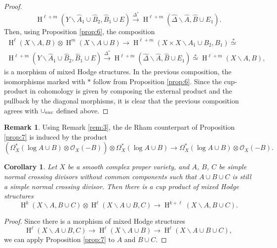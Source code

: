 \documentclass[11pt,a4paper]{amsart}
\newcommand{\caO}{\mathcal{O}}
\DeclareMathOperator{\rH}{H}
\newcommand{\exc}{\text{\rm exc}}
\numberwithin{equation}{section}
\theoremstyle{plain}
\newtheorem{cor}[prop]{Corollary}
\theoremstyle{definition}
\newtheorem{rmk}[prop]{Remark}
\begin{document}
\begin{proof}
\begin{displaymath}
   \rH^{\ell+m}(Y\smallsetminus \widehat A_{1}\cup \widehat
  B_{2},\widehat B_{1}\cup E)
  \xrightarrow{\Delta ^{\ast}}
  \rH^{\ell+m}(\widehat \Delta \smallsetminus \widehat A,\widehat
  B\cup E_{1}).
\end{displaymath}
Then, using
Proposition \ref{prop:6}, the 
composition 
\begin{multline*}
  \rH^{\ell}(X\smallsetminus A,B)\otimes
  \rH^{m}(X\smallsetminus A\cup B)
  \longrightarrow
  \rH^{\ell+m}(X\times X\smallsetminus A_{1}\cup B_{2},B_{1})
  \overset{\ast}{\simeq}\\
  \rH^{\ell+m}(Y\smallsetminus \widehat A_{1}\cup \widehat
  B_{2},\widehat B_{1}\cup E)
  \xrightarrow{\Delta ^{\ast}}
  \rH^{\ell+m}(\widehat \Delta \smallsetminus \widehat A,\widehat
  B\cup E_{1})
  \overset{\ast}{\simeq}
    \rH^{\ell+m}(X\smallsetminus A,B),
  \end{multline*}
  is a morphism of mixed Hodge structures. In the previous
  composition, the isomorphisms marked with $\ast$ follow from
  Proposition \ref{prop:6}. Since the cup-product in cohomology is
  given  by
  composing the external product and the pullback by the diagonal
  morphisms, it is clear that the previous composition agrees with $\cup_{\exc}$ defined above. 
\end{proof}

\begin{rmk}\label{rem:2} Using Remark \ref{rem:3}, the de Rham counterpart of Proposition
  \ref{prop:7}  is induced by the product
  \begin{displaymath}
    (\Omega ^{\ast}_{X}(\log A\cup B)\otimes  \caO_{X}(-B))
    \otimes \Omega ^{\ast}_{X}(\log A\cup B) \longrightarrow
    \Omega ^{\ast}_{X}(\log A\cup B)\otimes  \caO_{X}(-B).
  \end{displaymath}
\end{rmk}

 \begin{cor}\label{cor:3}
     Let $X$ be a smooth complex proper variety, and $A$, $B$, $C$ be
  simple normal crossing divisors without common
  components such that $A\cup B\cup C$ is still a
  simple normal crossing divisor. Then there is a cup product of
  mixed Hodge structures
  \begin{displaymath}
    \rH^{k}(X\smallsetminus A, B\cup C)\otimes
    \rH^{\ell}(X\smallsetminus A\cup B, C)
    \longrightarrow
        \rH^{k+\ell}(X\smallsetminus A, B\cup C).
      \end{displaymath}
\end{cor}
\begin{proof}
 Since there is a morphism of mixed Hodge structures
 \begin{displaymath}
\rH^{\ell}(X\smallsetminus A\cup B, C)\to \rH^{\ell}(X\smallsetminus A\cup B)\to \rH^{\ell}(X\smallsetminus
A\cup B\cup C),
\end{displaymath}
we can apply Proposition \ref{prop:7} to $A$ and
$B\cup C$.
\end{proof}
\end{document}
